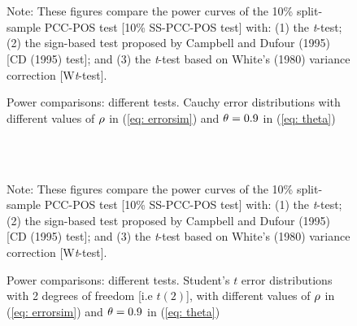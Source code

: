 \documentclass[harvard,11pt]{article}
\begin{document}
\begin{figure}[tbph]
\caption{Power comparisons: different tests. Cauchy error distributions with
different values of $\protect\rho $ in (\protect\ref{eq: errorsim}) and $\protect%
\theta =0.9$ in (\protect\ref{eq: theta})}
\begin{center}
 \\[0pt]
\\[0pt]
\end{center}
\doublespacing
 Note: These figures compare the power curves of the 10\% split-sample PCC-POS test
[10\% SS-PCC-POS test] with: (1) the \textit{t}-test; (2) the sign-based test
proposed by Campbell and Dufour (1995) [CD (1995) test]; and (3) the \textit{t}-test based
on White's (1980) variance correction [W\textit{t}-test]. 
\label{fig: Sim28}
\end{figure}


\begin{figure}[tbph]
\caption{Power comparisons: different tests. Student's $t$ error distributions with 2 degrees of freedom [i.e $t(2)$], with
different values of $\protect\rho $ in (\protect\ref{eq: errorsim}) and $\protect%
\theta =0.9$ in (\protect\ref{eq: theta})}
\begin{center}
 \\[0pt]
\\[0pt]
\end{center}
\doublespacing
Note: These figures compare the power curves of the 10\% split-sample PCC-POS test
[10\% SS-PCC-POS test] with: (1) the \textit{t}-test; (2) the sign-based test
proposed by Campbell and Dufour (1995) [CD (1995) test]; and (3) the \textit{t}-test based
on White's (1980) variance correction [W\textit{t}-test]. 
\label{fig: Sim39}
\end{figure}
\end{document}
